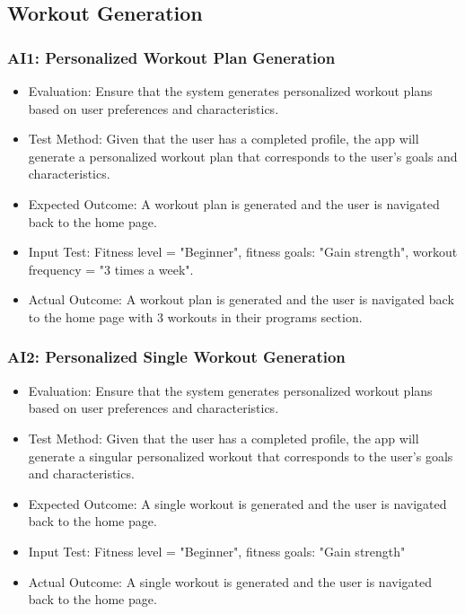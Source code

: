 \documentclass[12pt, titlepage]{article}
\begin{document}
\subsection{Workout Generation}
\subsubsection{AI1: Personalized Workout Plan Generation}
\begin{itemize}
    \item Evaluation: Ensure that the system generates personalized workout plans based on user preferences and characteristics.
    \item Test Method: Given that the user has a completed profile, the app will generate a personalized workout plan that corresponds to the user’s goals and characteristics.
    \item Expected Outcome: A workout plan is generated and the user is navigated back to the home page.
    \item Input Test: Fitness level = "Beginner", fitness goals: "Gain strength", workout frequency = "3 times a week".
    \item Actual Outcome: A workout plan is generated and the user is navigated back to the home page with 3 workouts in their programs section.
\end{itemize} 
\subsubsection{AI2: Personalized Single Workout Generation}
\begin{itemize}
    \item Evaluation: Ensure that the system generates personalized workout plans based on user preferences and characteristics.
    \item Test Method: Given that the user has a completed profile, the app will generate a singular personalized workout that corresponds to the user’s goals and characteristics.
    \item Expected Outcome: A single workout is generated and the user is navigated back to the home page.
    \item Input Test: Fitness level = "Beginner", fitness goals: "Gain strength"
    \item Actual Outcome: A single workout is generated and the user is navigated back to the home page.
\end{itemize} 
\end{document}

